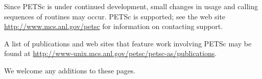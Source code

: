 Since PETSc is under continued development, small changes in usage and
calling sequences of routines may occur.  PETSc is supported; see the
web site \href{http://www.mcs.anl.gov/petsc}{http://www.mcs.anl.gov/petsc} for information on
contacting support.

A list of publications and web sites that feature work involving PETSc may be found at 
\href{http://www-unix.mcs.anl.gov/petsc/petsc-as/publications}{http://www-unix.mcs.anl.gov/petsc/petsc-as/publications}. 

We welcome any additions to these pages.

\medskip \medskip



